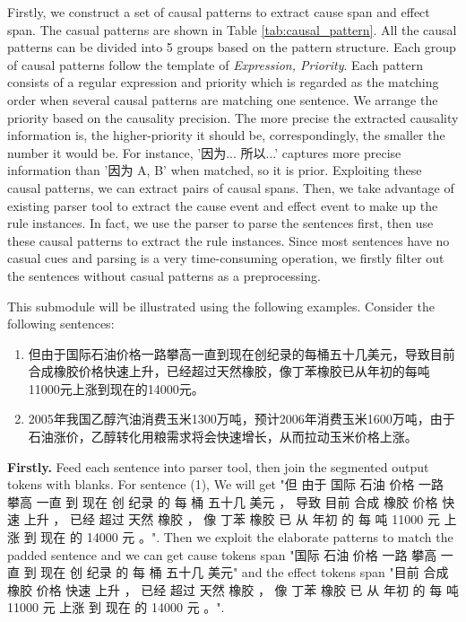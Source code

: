 Firstly, we construct a set of causal patterns to extract cause span and effect span. The casual patterns are shown in Table \ref{tab:causal_pattern}. All the causal patterns can be divided into 5 groups based on the pattern structure. Each group of causal patterns follow the template of \textit{Expression, Priority}. Each pattern consists of a regular expression and priority which is regarded as the matching order when several causal patterns are matching one sentence. We arrange the priority based on the causality precision. The more precise the extracted causality information is, the higher-priority it should be, correspondingly, the smaller the number it would be. For instance, '因为... 所以...' captures more precise information than '因为 A, B' when matched, so it is prior. 
%
%
Exploiting these causal patterns, we can extract pairs of causal spans. Then, we take advantage of existing parser tool\cite{manning2014stanford} to extract the cause event and effect event to make up the rule instances. In fact, we use the parser to parse the sentences first, then use these causal patterns to extract the rule instances. Since most sentences have no casual cues and parsing is a very time-consuming operation, we firstly filter out the sentences without casual patterns as a preprocessing.

This submodule will be illustrated using the following examples. Consider the following sentences:
\begin{enumerate}[\IEEEsetlabelwidth{12)}]
	\item 但由于国际石油价格一路攀高一直到现在创纪录的每桶五十几美元，导致目前合成橡胶价格快速上升，已经超过天然橡胶，像丁苯橡胶已从年初的每吨11000元上涨到现在的14000元。\\
	
	\item 2005年我国乙醇汽油消费玉米1300万吨，预计2006年消费玉米1600万吨，由于石油涨价，乙醇转化用粮需求将会快速增长，从而拉动玉米价格上涨。	
\end{enumerate}

\textbf{Firstly.} Feed each sentence into parser tool, then join the  segmented	 output tokens with blanks. For sentence (1), We will get "但 由于 国际 石油 价格 一路 攀高 一直 到 现在 创 纪录 的 每 桶 五十几 美元 ， 导致 目前 合成 橡胶 价格 快速 上升 ， 已经 超过 天然 橡胶 ， 像 丁苯 橡胶 已 从 年初 的 每 吨 11000 元 上涨 到 现在 的 14000 元 。". Then we exploit the elaborate patterns to match the padded sentence and we can get cause tokens span "国际 石油 价格 一路 攀高 一直 到 现在 创 纪录 的 每 桶 五十几 美元" and the effect tokens span "目前 合成 橡胶 价格 快速 上升 ， 已经 超过 天然 橡胶 ， 像 丁苯 橡胶 已 从 年初 的 每 吨 11000 元 上涨 到 现在 的 14000 元 。".

